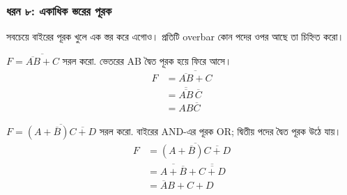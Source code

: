 \subsubsection*{ধরন ৮: একাধিক স্তরের পূরক}
সবচেয়ে বাইরের পূরক খুলে এক স্তর করে এগোও। প্রতিটি overbar কোন পদের ওপর আছে তা চিহ্নিত করো।
\par\smallskip\noindent\begin{minipage}{\linewidth}
$F=\overline{\overline{AB}+C}$ সরল করো.
\chThreeAnswer ভেতরের AB দ্বৈত পূরক হয়ে ফিরে আসে।
\[\begin{aligned}F&=\overline{\overline{AB}+C}\\
&=\overline{\overline{AB}}\,\overline C\\
&=AB\overline C\end{aligned}\]

\end{minipage}\par\smallskip
\par\smallskip\noindent\begin{minipage}{\linewidth}
$F=\overline{(A+\overline B)\overline{C+D}}$ সরল করো.
\chThreeAnswer বাইরের AND-এর পূরক OR; দ্বিতীয় পদের দ্বৈত পূরক উঠে যায়।
\[\begin{aligned}F&=\overline{(A+\overline B)\overline{C+D}}\\
&=\overline{A+\overline B}+\overline{\overline{C+D}}\\
&=\overline AB+C+D\end{aligned}\]

\end{minipage}\par\smallskip
{}
